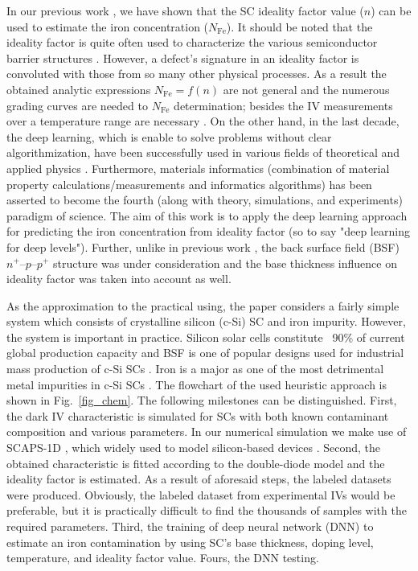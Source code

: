 \documentclass[a4paper,fleqn]{cas-sc}
\begin{document}
In our previous work \citep{Olikh2019SM}, we have shown that the SC ideality factor value ($n$) can be used to estimate the iron concentration ($N_{\mathrm{Fe}}$).
It should be noted that the ideality factor is quite often  used to characterize the various
semiconductor barrier structures \cite{Heide,Duan,n_CharGaN,n_CharSemic,n_CharPhysRevAppl}.
However, a defect's signature in an ideality factor is convoluted with those from so many other physical processes.
As a result the obtained analytic expressions $N_{\mathrm{Fe}}=f(n)$ are not general and the numerous grading curves are needed to $N_{\mathrm{Fe}}$ determination;
besides the IV measurements over a temperature range are necessary \citep{Olikh2019SM}.
On the other hand, in the last decade, the deep learning, which is enable to solve problems without clear algorithmization, have been successfully used in various fields of theoretical and applied physics \cite{MachLean_RevModPhys,MachLeanJAP,MachLeanPPV}.
Furthermore, materials informatics
(combination of material property calculations/measurements and informatics algorithms)
has been asserted \cite{MI_JAP} to become the fourth (along with theory, simulations, and experiments) paradigm of science.
The aim of this work is to apply the deep learning approach for predicting the iron concentration from ideality factor
(so to say "deep learning for deep levels").
Further, unlike in previous work \citep{Olikh2019SM}, the back surface field (BSF) $n^+$--$p$--$p^+$ structure was under consideration
and the base thickness influence on ideality factor was taken into account as well.

As the approximation to the practical using, the paper considers a fairly simple system
which consists of crystalline silicon (c-Si) SC  and iron impurity.
However, the system is important in practice.
Silicon solar cells constitute ~90\% of current global production capacity \citep{SCRev2015} and
BSF  is one of  popular designs used for industrial mass production of c-Si SCs \citep{SCRev2020}.
Iron is a major as one of the most detrimental metal impurities in c-Si SCs \citep{ZHU2016192,FeB:Schmidt,IronSC}.
The flowchart of the used heuristic approach is shown in Fig.~\ref{fig_chem}.
The following milestones can be distinguished.
First, the dark IV characteristic is simulated for SCs with both known contaminant composition and various parameters.
In our numerical simulation we make use of SCAPS-1D \citep{SCAPS1,SCAPS2},
which widely used to model silicon-based devices \citep{SCAPSuseSi4,SCAPSuseSi1,SCAPSuseSi6}.
Second, the obtained characteristic is fitted according to the double-diode model and the ideality factor is estimated.
As a result of aforesaid steps, the labeled datasets were produced.
Obviously, the labeled dataset from experimental IVs  would be preferable,
but it is practically difficult to find the thousands of samples with the required parameters.
Third, the training of deep neural network (DNN) to estimate an iron contamination  by using SC's base thickness, doping level,
temperature, and ideality factor value.
Fours, the DNN testing.
\end{document}
